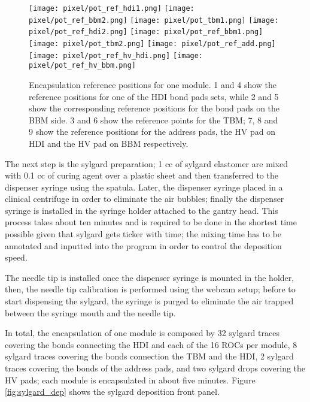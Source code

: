 \begin{figure}[h]
\begin{center}
  \texttt{[image: pixel/pot\_ref\_hdi1.png]}
  \texttt{[image: pixel/pot\_ref\_bbm2.png]}
  \texttt{[image: pixel/pot\_tbm1.png]}
  \texttt{[image: pixel/pot\_ref\_hdi2.png]}
  \texttt{[image: pixel/pot\_ref\_bbm1.png]}
  \texttt{[image: pixel/pot\_tbm2.png]}
  \texttt{[image: pixel/pot\_ref\_add.png]}
  \texttt{[image: pixel/pot\_ref\_hv\_hdi.png]}
  \texttt{[image: pixel/pot\_ref\_hv\_bbm.png]}
 \caption[Encapsulation reference positions.]{Encapsulation reference positions for one module. 1 and 4 show the reference positions for one of the HDI bond pads sets, while 2 and 5 show the corresponding reference positions for the bond pads on the BBM side. 3 and 6 show the reference points for the TBM; 7, 8 and 9 show the reference positions for the address pads, the HV pad on HDI and the HV pad on BBM respectively.}\label{fig:potting_references}
\end{center}
\end{figure}

The next step is the sylgard preparation; 1 cc of sylgard elastomer are mixed with 0.1 cc of curing agent over a plastic sheet and then transferred to the dispenser syringe using the spatula. Later, the dispenser syringe placed in a clinical centrifuge in order to eliminate the air bubbles; finally the dispenser syringe is installed in the syringe holder attached to the gantry head. This process takes about ten minutes and is required to be done in the shortest time possible given that sylgard gets ticker with time; the mixing time has to be annotated and inputted into the program in order to control the deposition speed.

The needle tip is installed once the dispenser syringe is mounted in the holder, then, the needle tip calibration is performed using the webcam setup; before to start dispensing the sylgard, the syringe is purged to eliminate the air trapped between the syringe mouth and the needle tip.

In total, the encapsulation of one module is composed by 32 sylgard traces covering the bonds connecting the HDI and each of the 16 ROCs per module, 8 sylgard traces covering the bonds connection the TBM and the HDI, 2 sylgard traces covering the bonds of the address pads, and two sylgard drops covering the HV pads; each module is encapsulated in about five minutes. Figure \ref{fig:sylgard_dep} shows the sylgard deposition front panel. 

